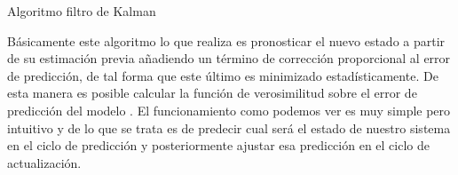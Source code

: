\begin{algorithm}
\begin{algorithmic} [1]
\end{algorithmic}
\caption{Algoritmo filtro de Kalman}\label{alg:algoritmoKalman}
\end{algorithm}
%
%
%
%
%

Básicamente este algoritmo lo que realiza es pronosticar el nuevo estado a partir de su estimación previa añadiendo un término de corrección proporcional al error de predicción, de tal forma que este último es minimizado estadísticamente. 
De esta manera es posible calcular la función de verosimilitud sobre el error de predicción del modelo . 
%
%
%
El funcionamiento como podemos ver es muy simple pero intuitivo y de lo que se trata es de predecir cual será el estado de nuestro sistema en el ciclo de predicción y posteriormente ajustar esa predicción en el ciclo de actualización.
%
%
%

